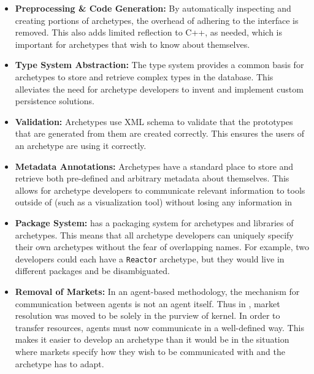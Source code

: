 \begin{itemize}
    \item \textbf{Preprocessing \& Code Generation:}  By automatically 
        inspecting and creating portions of archetypes, the overhead
        of adhering to the \cyclus interface is removed. This also 
        adds limited reflection to C++, as needed, which is important 
        for archetypes that wish to know about themselves.

    \item \textbf{Type System Abstraction:} The \Cyclus type system 
        provides a common basis for archetypes to store and retrieve 
        complex types in the database. This alleviates the need for archetype
        developers to invent and implement custom persistence solutions.

    \item \textbf{Validation:} Archetypes use \gls{XML} schema to validate that 
        the prototypes that are generated from them are created correctly.
        This ensures the users of an archetype are using it correctly.

    \item \textbf{Metadata Annotations:} Archetypes have a standard place to 
        store and retrieve both pre-defined and arbitrary metadata about themselves.
        This allows for archetype developers to communicate relevant information
        to tools outside of \cyclus (such as a visualization tool) without
        losing any information in 

    \item \textbf{Package System:} \Cyclus has a packaging system for archetypes and 
        libraries of archetypes. This means that all archetype developers can 
        uniquely specify their own archetypes without the fear of overlapping 
        names.  For example, two developers could each have a \texttt{Reactor}
        archetype, but they would live in different packages and be 
        disambiguated.

    \item \textbf{Removal of Markets:} In an agent-based methodology, 
        the mechanism for communication between agents is not an agent itself.
        Thus in \cyclus, market resolution was moved to be solely in the purview 
        of kernel. In order to transfer resources, agents must now communicate 
        in a well-defined way. This makes it easier to develop an archetype than 
        it would be in the situation where markets specify how they wish to be communicated with 
        and the archetype has to adapt. 

\end{itemize}

